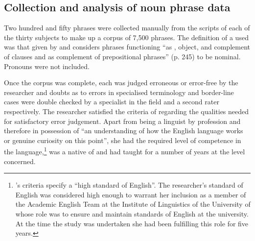 \documentclass[output=paper]{langsci/langscibook}
\begin{document}
\subsection{Collection and analysis of noun phrase data}

Two hundred and fifty  phrases were collected manually from the
scripts of each of the thirty subjects to make up a corpus of 7,500
 phrases. The definition of a   used was that given by
\citet{Quirketal1985} and considers phrases functioning “as ,
object, and complement of clauses and as complement of prepositional
phrases” (p. 245) to be nominal. Pronouns were not included.



Once the corpus was complete, each   was judged erroneous or
error-free by the researcher and doubts as to errors in specialised
terminology and border-line cases were double checked by a specialist
in the field and a second rater respectively. The researcher satisfied
the criteria of \citet[72]{Etherton1977} regarding the qualities needed for
satisfactory error judgement. Apart from being a linguist by
profession and therefore in possession of “an understanding of how the
English language works or genuine curiosity on this point”, %
she had the required level of competence in the
language,\footnote{\citet[72]{Etherton1977}'s criteria specify a “high standard
  of English”. The researcher’s standard of English was
  considered high enough to warrant her inclusion as a member of the
  Academic English Team at the Institute of Linguistics of the
  University of  whose role was to ensure and maintain standards
  of English at the university. At the time the study was undertaken
  she had been fulfilling this role for five years.} was a native
 of  and had taught for a number of years at the level
concerned.
\end{document}
